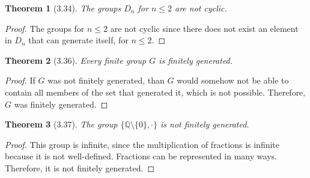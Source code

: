 \documentclass{article}
\newtheorem*{thm}{Theorem}
\begin{document}
\begin{thm}[3.34]
	The groups $D_n$ for $n\le 2$ are not cyclic. 
\end{thm}
\begin{proof}
	The groups for $n \le 2$ are not cyclic since there does not exist an element in $D_n$ that can generate itself, for $n\le2$. 
\end{proof}

\begin{thm}[3.36]
	Every finite group $G$ is finitely generated. 
\end{thm}
\begin{proof}
	If $G$ was not finitely generated, than $G$ would somehow not be able to contain all members of the set that generated it, which is 
	not possible. Therefore, $G$ was finitely generated. 
\end{proof}

\begin{thm}[3.37]
	The group $\{\mathbb{Q} \setminus \{0\}, \cdot\}$ is not finitely generated. 
\end{thm}
\begin{proof}
	This group is infinite, since the multiplication of fractions is infinite because it is not well-defined. Fractions can be represented in 
	many ways. Therefore, it is not finitely generated. 
\end{proof}
\end{document}
